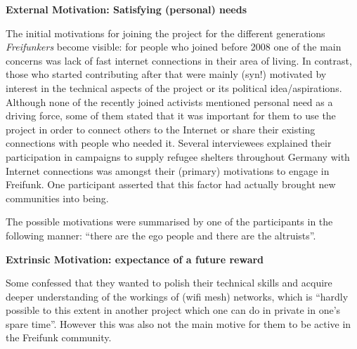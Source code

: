 \textbf{External Motivation: Satisfying (personal) needs}

The initial motivations for joining the project for the different generations \textit{Freifunkers} become visible:
for people who joined before 2008 one of the main concerns was lack of fast internet connections in their area of living.
In contrast, those who started contributing after that were mainly (syn!) motivated by interest in the technical aspects of the project or its political idea/aspirations.
Although none of the recently joined activists mentioned personal need as a driving force,
some of them stated that it was important for them to use the project in order to connect others to the Internet or share their existing connections with people who needed it.
Several interviewees explained their participation in campaigns to supply refugee shelters throughout Germany with Internet connections was amongst their (primary) motivations to engage in Freifunk.
One participant asserted that this factor had actually brought new communities into being.


The possible motivations were summarised by one of the participants in the following manner: ``there are the ego people and there are the altruists''.


\textbf{Extrinsic Motivation: expectance of a future reward}

Some confessed that they wanted to polish their technical skills and acquire deeper understanding of the workings of (wifi mesh) networks, which is ``hardly possible to this extent in another project which one can do in private in one's spare time''.
However this was also not the main motive for them to be active in the Freifunk community.

